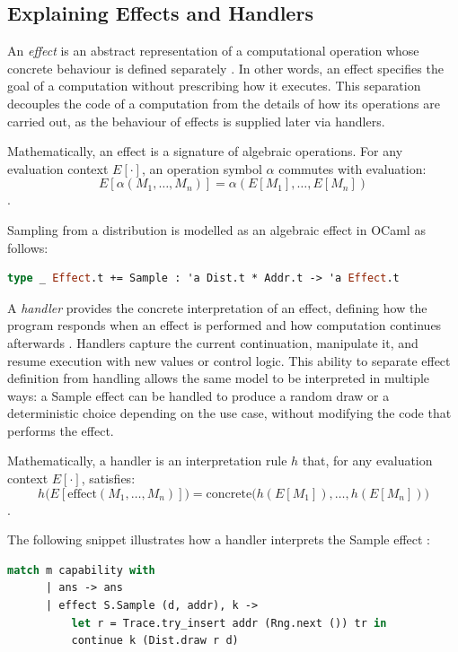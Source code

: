 \documentclass[logo,bsc,singlespacing,parskip,online]{infthesis}
\begin{document}
\subsection{Explaining Effects and Handlers}

An \textit{effect} is an abstract representation of a computational operation whose concrete behaviour is defined separately \citep{Plotkin2003}. 
In other words, an effect specifies the goal of a computation without prescribing how it executes. 
This separation decouples the code of a computation from the details of how its operations are carried out, as the behaviour of effects is supplied later via handlers.

Mathematically, an effect is a signature of algebraic operations. 
For any evaluation context $E[\cdot]$, an operation symbol $\alpha$ commutes with evaluation:
\[
E[\alpha(M_1, \dots, M_n)] = \alpha(E[M_1], \dots, E[M_n])
\]
\citep{Plotkin2003}. 

Sampling from a distribution is modelled as an algebraic effect in OCaml as follows:
\begin{lstlisting}[language=OCaml]
type _ Effect.t += Sample : 'a Dist.t * Addr.t -> 'a Effect.t
\end{lstlisting}

A \textit{handler} provides the concrete interpretation of an effect, defining how the program responds when an effect is performed and how computation continues afterwards \citep{Plotkin2009}. 
Handlers capture the current continuation, manipulate it, and resume execution with new values or control logic. 
This ability to separate effect definition from handling allows the same model to be interpreted in multiple ways: a Sample effect can be handled to produce a random draw or a deterministic choice depending on the use case, without modifying the code that performs the effect.

Mathematically, a handler is an interpretation rule $h$ that, for any evaluation context $E[\cdot]$, satisfies:
\[
h\bigl(E[\text{effect}(M_1, \dots, M_n)]\bigr)
  = \text{concrete}\bigl(h(E[M_1]), \dots, h(E[M_n])\bigr)
\]
\citep{Plotkin2009}. 

The following snippet illustrates how a handler interprets the Sample effect :
\begin{lstlisting}[language=OCaml]
 match m capability with
      | ans -> ans
      | effect S.Sample (d, addr), k ->
          let r = Trace.try_insert addr (Rng.next ()) tr in
          continue k (Dist.draw r d)
\end{lstlisting}
\end{document}
